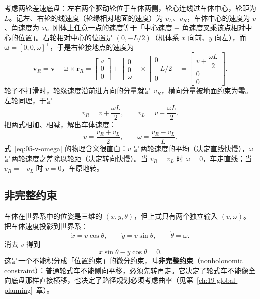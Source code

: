 考虑两轮差速底盘：左右两个驱动轮位于车体两侧，轮心连线过车体中心，轮距为 $L$。记左、右轮的线速度（轮缘相对地面的速度）为 $v_L$、$v_R$，车体中心的速度为 $v$、角速度为 $\omega$。刚体上任意一点的速度等于「中心速度 + 角速度叉乘该点相对中心的位置」。右轮相对中心的位置是 $(0,-L/2)$（机体系 $x$ 向前、$y$ 向左），而 $\bm{\omega}=[0,0,\omega]^{\top}$，于是右轮接地点的速度为
\begin{equation}
  \bm{v}_{R} = \bm{v} + \bm{\omega}\times\bm{r}_{R}
  = \begin{bmatrix}v\\0\\0\end{bmatrix}
  + \begin{bmatrix}0\\0\\\omega\end{bmatrix}\times\begin{bmatrix}0\\-L/2\\0\end{bmatrix}
  = \begin{bmatrix}v+\dfrac{\omega L}{2}\\[2mm] 0\\0\end{bmatrix}.
  \label{eq:05-wheel-point}
\end{equation}
轮子不打滑时，轮缘速度沿前进方向的分量就是 $v_R$，横向分量被地面约束为零。左轮同理，于是
\begin{equation}
  v_R = v + \frac{\omega L}{2},
  \qquad
  v_L = v - \frac{\omega L}{2}.
  \label{eq:05-wheel-v}
\end{equation}
把两式相加、相减，解出车体速度：
\begin{equation}
  v = \frac{v_R+v_L}{2},
  \qquad
  \omega = \frac{v_R-v_L}{L}.
  \label{eq:05-v-omega}
\end{equation}
式~\eqref{eq:05-v-omega} 的物理含义很直白：$v$ 是两轮速度的平均（决定直线快慢），$\omega$ 是两轮速度之差除以轮距（决定转向快慢）。当 $v_R=v_L$ 时 $\omega=0$，车走直线；当 $v_R=-v_L$ 时 $v=0$，车原地转。

\subsection{非完整约束}

车体在世界系中的位姿是三维的 $(x,y,\theta)$，但上式只有两个独立输入 $(v,\omega)$。把车体速度投影到世界系：
\begin{equation}
  \dot{x}=v\cos\theta,\qquad \dot{y}=v\sin\theta,\qquad \dot{\theta}=\omega.
  \label{eq:05-kinematics}
\end{equation}
消去 $v$ 得到
\begin{equation}
  \dot{x}\sin\theta-\dot{y}\cos\theta = 0.
  \label{eq:05-nonholonomic}
\end{equation}
这是一个不能积分成「位置约束」的微分约束，叫\textbf{非完整约束}（nonholonomic constraint）：普通轮式车不能侧向平移，必须先转再走。它决定了轮式车不能像全向底盘那样直接横移，也决定了路径规划必须考虑曲率（见第~\ref{ch:19-global-planning}~章）。

